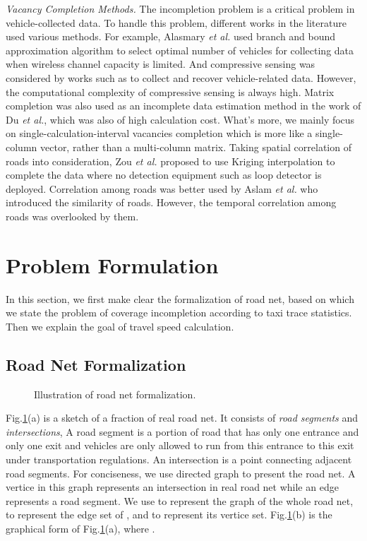 \documentclass[twocolumn,10pt,final,conference]{IEEEtran}
\def\etal{\textit{et al.}\xspace}
\begin{document}
\emph{Vacancy Completion Methods.}
The incompletion problem is a critical problem in vehicle-collected data. To handle this problem, different works in the literature used various methods. For example, Alasmary \etal \cite{Ref41} used branch and bound approximation algorithm to select optimal number of vehicles for collecting data when wireless channel capacity is limited. And compressive sensing was considered by works such as \cite{Ref49} \cite{Ref50} \cite{Ref51} to collect and recover vehicle-related data. However, the computational complexity of compressive sensing is always high.
Matrix completion  was also used as an incomplete data estimation method in the work of Du \etal \cite{Ref16}, which was also of high calculation cost. What's more, we mainly focus on single-calculation-interval vacancies completion which is more like a single-column vector, rather than a multi-column matrix. Taking spatial correlation of roads into consideration, Zou \etal \cite{Ref82} proposed to use Kriging interpolation to complete the data where no detection equipment such as loop detector is deployed. Correlation among roads was better used by Aslam \etal \cite{Ref79} who introduced the similarity of roads. However, the temporal correlation among roads was overlooked by them.





\section{Problem Formulation}\label{section-Problem Formulation}
In this section, we first make clear the formalization of road net, based on which we state the problem of coverage incompletion according to taxi trace statistics. Then we explain the goal of travel speed calculation.

\subsection{Road Net Formalization}
\begin{figure}[h]
\centering
{}
\caption{Illustration of road net formalization.}
\label{fig-Illstration of road net}
\end{figure}

Fig.\ref{fig-Illstration of road net}(a) is a sketch of a fraction of real road net. It consists of \emph{road segments} and \emph{intersections},
A road segment is a portion of road that has only one entrance and only one exit and vehicles are only allowed to run from this entrance to this exit under transportation regulations.
An intersection is a point connecting adjacent road segments. For conciseness, we use directed graph to present the road net.  A vertice in this graph represents an intersection in real road net while an edge represents a road segment. We use  to represent the graph of the whole road net,  to represent the edge set of , and  to represent its vertice set. Fig.\ref{fig-Illstration of road net}(b) is the graphical form of Fig.\ref{fig-Illstration of road net}(a), where .
\end{document}
